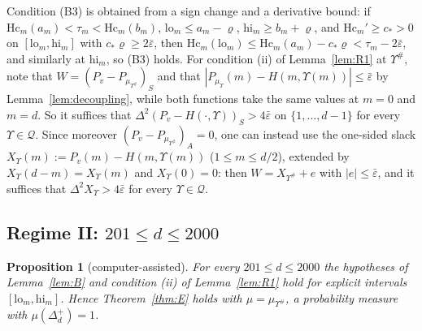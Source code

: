 \documentclass[11pt]{amsart}
\newtheorem{proposition}[theorem]{Proposition}
\theoremstyle{definition}
\theoremstyle{remark}
\numberwithin{equation}{section}
\begin{document}
Condition (B3) is obtained from a sign change and a derivative bound: if $\mathrm{Hc}_m(a_m)<\tau_m<\mathrm{Hc}_m(b_m)$,
$\mathrm{lo}_m\le a_m-\varrho$, $\mathrm{hi}_m\ge b_m+\varrho$, and $\mathrm{Hc}_m'\ge c_*>0$ on $[\mathrm{lo}_m,\mathrm{hi}_m]$ with
$c_*\varrho\ge2\bar\varepsilon$, then $\mathrm{Hc}_m(\mathrm{lo}_m)\le\mathrm{Hc}_m(a_m)-c_*\varrho<\tau_m-2\bar\varepsilon$, and
similarly at $\mathrm{hi}_m$, so (B3) holds. For condition (ii) of Lemma~\ref{lem:R1} at $\Upsilon^\#$, note that
$W=(P_v-P_{\mu_{\Upsilon^\#}})_S$ and that $|P_{\mu_\Upsilon}(m)-H(m,\Upsilon(m))|\le\bar\varepsilon$ by
Lemma~\ref{lem:decoupling}, while both functions take the same values at $m=0$ and $m=d$. So it suffices that
$\Delta^2(P_v-H(\cdot,\Upsilon))_S>4\bar\varepsilon$ on $\{1,\dots,d-1\}$ for every $\Upsilon\in\mathcal Q$. Since moreover
$(P_v-P_{\mu_{\Upsilon^\#}})_A=0$, one can instead use the one-sided slack $X_\Upsilon(m):=P_v(m)-H(m,\Upsilon(m))$
($1\le m\le d/2$), extended by $X_\Upsilon(d-m)=X_\Upsilon(m)$ and $X_\Upsilon(0)=0$: then $W=X_{\Upsilon^\#}+e$ with
$|e|\le\bar\varepsilon$, and it suffices that $\Delta^2X_\Upsilon>4\bar\varepsilon$ for every $\Upsilon\in\mathcal Q$.

\subsection{Regime II: \texorpdfstring{$201\le d\le2000$}{201 <= d <= 2000}}\label{subsec:regimeII}

\begin{proposition}[computer-assisted]\label{prop:regimeII}
For every $201\le d\le2000$ the hypotheses of Lemma~\ref{lem:B} and condition (ii) of Lemma~\ref{lem:R1} hold for explicit
intervals $[\mathrm{lo}_m,\mathrm{hi}_m]$. Hence Theorem~\ref{thm:E} holds with $\mu=\mu_{\Upsilon^\#}$, a probability measure with
$\mu(\Delta_d^+)=1$.
\end{proposition}
\end{document}
